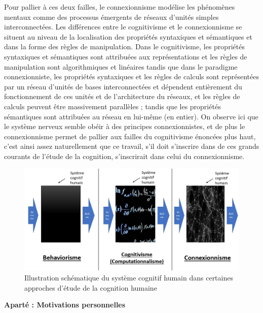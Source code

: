 \documentclass[12pt]{scrartcl}
\begin{document}
Pour pallier à ces deux failles, le connexionnisme modélise les phénomènes mentaux comme des processus émergents de réseaux d'unités simples interconnectées. Les différences entre le cognitivisme et le connexionnisme se situent au niveau de la localisation des propriétés syntaxiques et sémantiques et dans la forme des règles de manipulation. Dans le cognitivisme, les propriétés syntaxiques et sémantiques sont attribuées aux représentations et les règles de manipulation sont algorithmiques et linéaires tandis que dans le paradigme connexionniste, les propriétés syntaxiques et les règles de calculs sont représentées par un réseau d'unités de bases interconnectées et dépendent entièrement du fonctionnement de ces unités et de l'architecture du réseaux, et les règles de calculs peuvent être massivement parallèles ; tandis que les propriétés sémantiques sont attribuées au réseau en lui-même (en entier). On observe ici que le système nerveux semble obéir à des principes connexionnistes, et de plus le connexionnisme permet de pallier aux failles du cognitivisme énoncées plus haut, c'est ainsi assez naturellement que ce travail, s’il doit s'inscrire dans de ces grands courants de l'étude de la cognition, s'inscrirait dans celui du connexionnisme.

\begin{figure}[!h]
\centering
\includegraphics[scale=0.35]{imgs/1.JPG}
\caption{Illustration schématique du système cognitif humain dans certaines approches d'étude de la cognition humaine}
\end{figure}

\pagebreak

\textbf{Aparté : Motivations personnelles}
\end{document}
